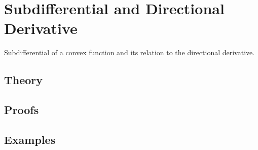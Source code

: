 
\section{Subdifferential and Directional Derivative}
\label{sec:2.4.05-subdifferential}

\begin{ticket}
Subdifferential of a convex function and its relation to the directional derivative.
\end{ticket}

\subsection*{Theory}

\subsection*{Proofs}

\subsection*{Examples}
